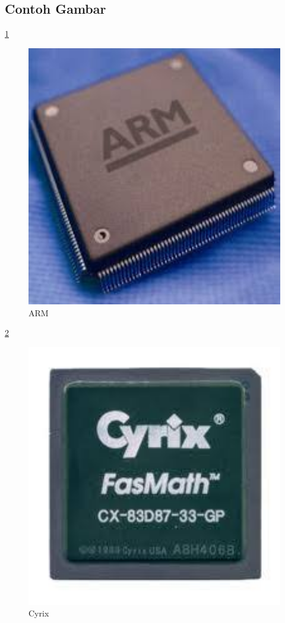\subsection{Contoh Gambar}

\ref{ARM}
\begin{figure}[ht]
\centerline{\includegraphics[width=1\textwidth]{figures/ARM.JPG}}
\caption{ARM}
\label{ARM}
\end{figure}

\ref{Cyrix}
\begin{figure}[ht]
\centerline{\includegraphics[width=1\textwidth]{figures/Cyrix.JPG}}
\caption{Cyrix}
\label{Cyrix}
\end{figure}

